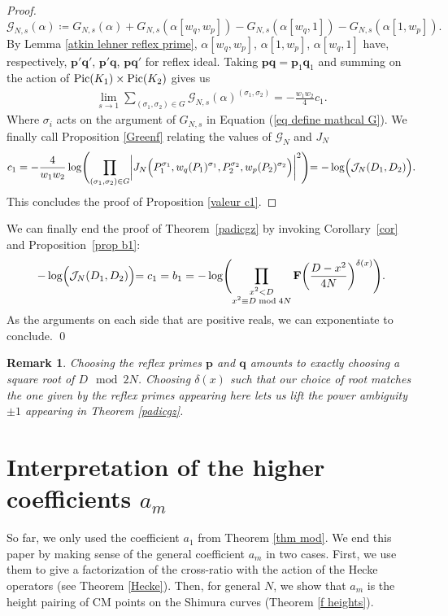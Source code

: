 \documentclass[a4paper,12pt]{article}
\newtheorem{remark}[theorem]{Remark}
\begin{document}
\begin{proof}
\begin{equation}\label{eq define mathcal G}
\mathcal{G}_{N,s}(\alpha)\coloneqq G_{N,s}(\alpha)+G_{N,s}(\alpha[w_q,w_p])-G_{N,s}(\alpha[w_q,1])-G_{N,s}(\alpha[1,w_p]).
\end{equation}
By Lemma \ref{atkin lehner reflex prime}, $\alpha[w_q,w_p]$, $\alpha[1,w_p]$, $\alpha[w_q,1]$  have, respectively, $\mathbf{p}'\mathbf{q}'$, $\mathbf{p}'\mathbf{q}$, $\mathbf{p}\mathbf{q}'$ for reflex ideal. 
Taking $\mathbf{p}\mathbf{q}=\mathbf{p}_1\mathbf{q}_1$ and summing on the action of $\textup{Pic}(K_1)\times\textup{Pic}(K_2)$ gives us
\begin{align*}
\lim_{s\rightarrow1}\sum_{(\sigma_1,\sigma_2)\in G}\mathcal{G}_{N,s}(\alpha)^{(\sigma_1,\sigma_2)}=-\frac{w_1w_2}{4}c_1.
\end{align*}
Where $\sigma_i$ acts on the argument of $G_{N,s}$ in Equation (\ref{eq define mathcal G}). We finally call Proposition \ref{Greenf} relating the values of $\mathcal{G}_N$ and $J_N$
\[c_1=-\frac{4}{w_1w_2}\log\Biggl(\prod_{\substack{(\sigma_1,\sigma_2)\in G}}
\biggl|J_N\Bigl(P_1^{\sigma_1},w_q(P_1)^{\sigma_1},P_2^{\sigma_2},w_p(P_2)^{\sigma_2}\Bigl)\biggl|^2\Biggl)=-\log\Bigl(\mathcal{J}_N(D_1,D_2)\Bigl).\]
 This concludes the proof of Proposition \ref{valeur c1}. 
\end{proof}
We can finally end the proof of Theorem~\ref{padicgz} by invoking Corollary~\ref{cor} and Proposition~\ref{prop b1}:
\[-\log\Bigl(\mathcal{J}_N(D_1,D_2)\Bigl)=c_1=b_1=-\log\Biggl(\prod_{\substack{x^2<D\\x^2\equiv D \bmod{4N}}}\mathbf{F}\biggl(\frac{D-x^2}{4N}\biggl)^{\delta(x)}\Biggl).\]
As the arguments on each side that are positive reals, we can exponentiate to conclude.
\qed
\begin{remark}
    Choosing the reflex primes $\mathbf{p}$ and $\mathbf{q}$ amounts to exactly choosing a square root of $D\mod 2N$. Choosing $\delta(x)$ such that our choice of root matches the one given by the reflex primes appearing here lets us lift the power ambiguity $\pm1$ appearing in Theorem \ref{padicgz}.
\end{remark}
\section{\texorpdfstring{Interpretation of the higher coefficients $a_m$}{Interpretation of the higher coefficients aₙ}}
So far, we only used the coefficient $a_1$ from Theorem \ref{thm mod}. We end this paper by making sense of the general coefficient $a_m$ in two cases. First, we use them to give a factorization of the cross-ratio with the action of the Hecke operators (see Theorem \ref{Hecke}). Then, for general $N$, we show that $a_m$ is the height pairing of CM points on the Shimura curves (Theorem \ref{f heights}).
\end{document}
